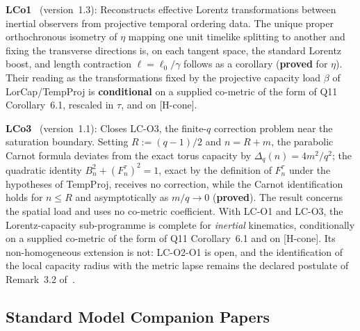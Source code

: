 \documentclass[11pt,a4paper]{article}
\newcommand{\sproved}{\textcolor{cproved}{\textbf{proved}}}
\newcommand{\scond}{\textcolor{ccond}{\textbf{conditional}}}
\begin{document}
    \textbf{LCo1}~\cite{Beau2026lco1} (version~1.3): Reconstructs effective Lorentz transformations between
    inertial observers from projective temporal ordering data.
    The unique proper orthochronous isometry of $\eta$ mapping one unit timelike splitting to another and fixing the
    transverse directions is, on each tangent space, the standard Lorentz boost, and length contraction $\ell = \ell_{0}/\gamma$ follows as a corollary (\sproved{} for
    $\eta$).
    Their reading as the transformations fixed by the projective capacity load $\beta$ of LorCap/TempProj is
    \scond{} on a supplied co-metric of the form of Q11 Corollary~6.1, rescaled in $\tau$, and on [H-cone].

    \textbf{LCo3}~\cite{Beau2026lco3} (version~1.1): Closes LC-O3, the finite-$q$ correction problem near
    the saturation boundary. Setting $R := (q-1)/2$ and $n = R+m$, the parabolic Carnot
    formula deviates from the exact torus capacity by $\Delta_{q}(n) = 4m^{2}/q^{2}$;
    the quadratic identity $B_{n}^{2} + (F_{n}^{\tau})^{2} = 1$, exact by the definition of $F_n^\tau$ under the
    hypotheses of TempProj, receives no correction,
    while the Carnot identification holds for $n \leq R$ and asymptotically as $m/q \to 0$
    (\sproved). The result concerns the spatial load and uses no co-metric coefficient.
    With LC-O1 and LC-O3, the Lorentz-capacity sub-programme is complete for
    \emph{inertial} kinematics, conditionally on a supplied co-metric of the form of Q11 Corollary~6.1 and on
    [H-cone].
    Its non-homogeneous extension is not: LC-O2-O1 is open, and the identification of the
    local capacity radius with the metric lapse remains the declared postulate of
    Remark~3.2 of~\cite{Beau2026lco2}.

  \subsection{Standard Model Companion Papers}
\end{document}
